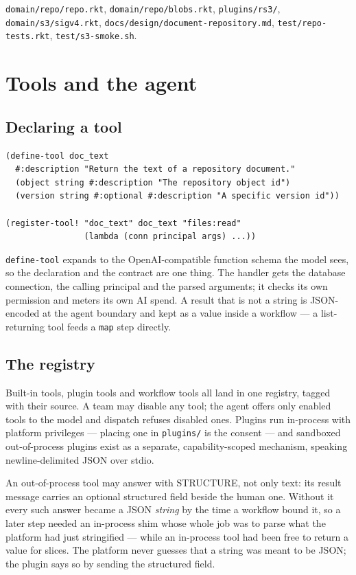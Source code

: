 \documentclass[11pt,a4paper]{report}
\gdef\currentchapterart{art/telemachus-head.png}
\newcommand{\chapterart}[1]{\gdef\currentchapterart{#1}}
\newcommand{\chapterart}[1]{}
\begin{document}
\texttt{domain/repo/repo.rkt}, \texttt{domain/repo/blobs.rkt}, \texttt{plugins/rs3/}, \texttt{domain/s3/sigv4.rkt}, \texttt{docs/design/document-repository.md}, \texttt{test/repo-tests.rkt}, \texttt{test/s3-smoke.sh}.

\chapterart{art/ch-07-tools.png}
\chapter{Tools and the agent}

\section{Declaring a tool}

\begin{lstlisting}
(define-tool doc_text
  #:description "Return the text of a repository document."
  (object string #:description "The repository object id")
  (version string #:optional #:description "A specific version id"))

(register-tool! "doc_text" doc_text "files:read"
                (lambda (conn principal args) ...))
\end{lstlisting}

\texttt{define-tool} expands to the OpenAI-compatible function schema the model sees, so the declaration and the contract are one thing. The handler gets the database connection, the calling principal and the parsed arguments; it checks its own permission and meters its own AI spend. A result that is not a string is JSON-encoded at the agent boundary and kept as a value inside a workflow --- a list-returning tool feeds a \texttt{map} step directly.

\section{The registry}

Built-in tools, plugin tools and workflow tools all land in one registry, tagged with their source. A team may disable any tool; the agent offers only enabled tools to the model and dispatch refuses disabled ones. Plugins run in-process with platform privileges --- placing one in \texttt{plugins/} is the consent --- and sandboxed out-of-process plugins exist as a separate, capability-scoped mechanism, speaking newline-delimited JSON over stdio.

An out-of-process tool may answer with STRUCTURE, not only text: its result message carries an optional structured field beside the human one. Without it every such answer became a JSON \emph{string} by the time a workflow bound it, so a later step needed an in-process shim whose whole job was to parse what the platform had just stringified --- while an in-process tool had been free to return a value for slices. The platform never guesses that a string was meant to be JSON; the plugin says so by sending the structured field.
\end{document}
